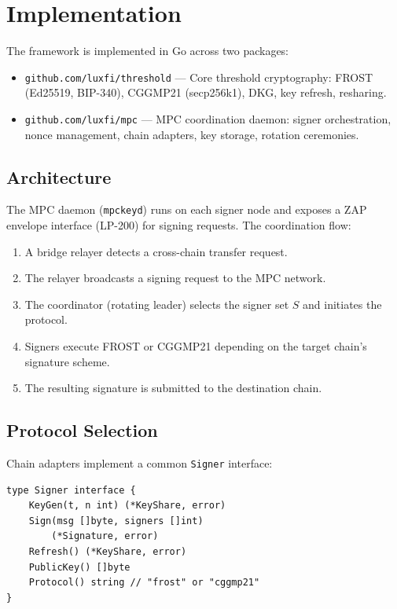 \section{Implementation}

\label{sec:impl}

The framework is implemented in Go across two packages:

\begin{itemize}[nosep]
  \item \texttt{github.com/luxfi/threshold} --- Core threshold cryptography: FROST
    (Ed25519, BIP-340), CGGMP21 (secp256k1), DKG, key refresh, resharing.
  \item \texttt{github.com/luxfi/mpc} --- MPC coordination daemon: signer
    orchestration, nonce management, chain adapters, key storage, rotation ceremonies.
\end{itemize}

\subsection{Architecture}

The MPC daemon (\texttt{mpckeyd}) runs on each signer node and exposes a ZAP
envelope interface (LP-200) for signing requests. The coordination flow:

\begin{enumerate}[nosep]
  \item A bridge relayer detects a cross-chain transfer request.
  \item The relayer broadcasts a signing request to the MPC network.
  \item The coordinator (rotating leader) selects the signer set $S$ and initiates
    the protocol.
  \item Signers execute FROST or CGGMP21 depending on the target chain's signature
    scheme.
  \item The resulting signature is submitted to the destination chain.
\end{enumerate}

\subsection{Protocol Selection}

Chain adapters implement a common \texttt{Signer} interface:

\begin{verbatim}
type Signer interface {
    KeyGen(t, n int) (*KeyShare, error)
    Sign(msg []byte, signers []int)
        (*Signature, error)
    Refresh() (*KeyShare, error)
    PublicKey() []byte
    Protocol() string // "frost" or "cggmp21"
}
\end{verbatim}

